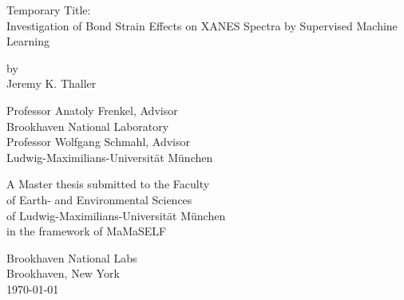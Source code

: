 \documentclass[12pt, oneside]{book}
\begin{document}
\begin{titlepage}
\begin{center}

\vspace*{2cm}

{\huge Temporary Title: \\ Investigation of Bond Strain Effects on XANES Spectra by Supervised Machine
	Learning} %

\vspace{2cm}

{\large by\\Jeremy K. Thaller}

\vspace{2cm}

\begin{multicols}{2}
	Professor Anatoly Frenkel, Advisor \hfill \\
	Brookhaven National Laboratory \hfill \\
	\columnbreak
	Professor Wolfgang Schmahl, Advisor \\
	Ludwig-Maximilians-Universität München
\end{multicols}


\vfill

A Master thesis submitted to the Faculty\\
of Earth- and Environmental Sciences\\ 
of Ludwig-Maximilians-Universität München\\
in the framework of MaMaSELF

\vspace*{3cm}

Brookhaven National Labs\\
Brookhaven, New York\\
\today %
\end{center}
\end{titlepage}

\frontmatter 
\end{document}
